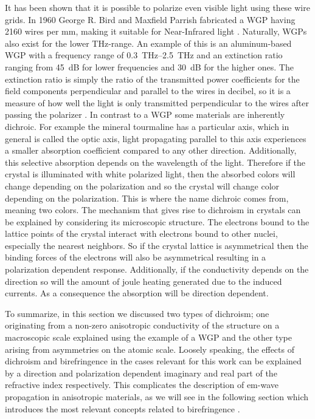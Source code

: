 It has been shown that it is possible to polarize even visible light using these wire grids. In 1960 George R. Bird and Maxfield Parrish fabricated a WGP having 2160 wires per mm, making it suitable for Near-Infrared light \cite{Bird1960}. Naturally, WGPs also exist for the lower THz-range. An example of this is an aluminum-based WGP with a frequency range of \SIrange{0.3}{2.5}{\tera \hertz} and an extinction ratio ranging from \SI{45}{\dB} for lower frequencies and \SI{30}{\dB} for the higher ones. The extinction ratio is simply the ratio of the transmitted power coefficients for the field components perpendicular and parallel to the wires in decibel, so it is a measure of how well the light is only transmitted perpendicular to the wires after passing the polarizer \cite{Ferraro2016}. 
In contrast to a WGP some materials are inherently dichroic. For example the mineral tourmaline has a particular axis, which in general is called the optic axis, light propagating parallel to this axis experiences a smaller absorption coefficient compared to any other direction. Additionally, this selective absorption depends on the wavelength of the light. Therefore if the crystal is illuminated with white polarized light, then the absorbed colors will change depending on the polarization and so the crystal will change color depending on the polarization. This is where the name dichroic comes from, meaning two colors. The mechanism that gives rise to dichroism in crystals can be explained by considering its microscopic structure. The electrons bound to the lattice points of the crystal interact with electrons bound to other nuclei, especially the nearest neighbors. So if the crystal lattice is asymmetrical then the binding forces of the electrons will also be asymmetrical resulting in a polarization dependent response. Additionally, if the conductivity depends on the direction so will the amount of joule heating generated due to the induced currents. As a consequence the absorption will be direction dependent. 

To summarize, in this section we discussed two types of dichroism; one originating from a non-zero anisotropic conductivity of the structure on a macroscopic scale explained using the example of a WGP and the other type arising from asymmetries on the atomic scale. Loosely speaking, the effects of dichroism and birefringence in the cases relevant for this work can be explained by a direction and polarization dependent imaginary and real part of the refractive index respectively. This complicates the description of em-wave propagation in anisotropic materials, as we will see in the following section which introduces the most relevant concepts related to birefringence \cite{Hecht}.
